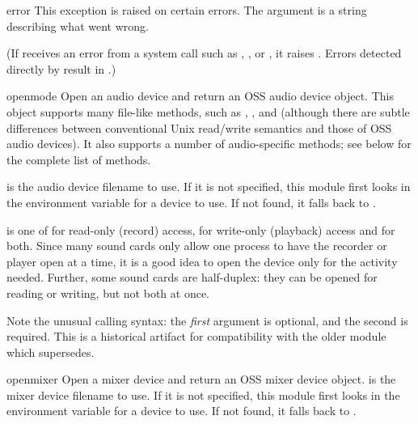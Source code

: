 \begin{excdesc}{error}
This exception is raised on certain errors.  The argument is a string
describing what went wrong.

(If  receives an error from a system call such as
, , or , it
raises .  Errors detected directly by
 result in .)
\end{excdesc}

\begin{funcdesc}{open}{mode}
Open an audio device and return an OSS audio device object.  This
object supports many file-like methods, such as ,
, and  (although there are subtle
differences between conventional Unix read/write semantics and those of
OSS audio devices).  It also supports a number of audio-specific
methods; see below for the complete list of methods.

 is the audio device filename to use.  If it is not
specified, this module first looks in the environment variable
 for a device to use.  If not found, it falls back to
.

 is one of  for read-only (record) access,
 for write-only (playback) access and  for both.
Since many sound cards only allow one process to have the recorder or
player open at a time, it is a good idea to open the device only for the
activity needed.  Further, some sound cards are half-duplex: they can be
opened for reading or writing, but not both at once.

Note the unusual calling syntax: the \emph{first} argument is optional,
and the second is required.  This is a historical artifact for
compatibility with the older  module which
 supersedes.  %
\end{funcdesc}

\begin{funcdesc}{openmixer}{}
Open a mixer device and return an OSS mixer device object.  
 is the mixer device filename to use.  If it is
not specified, this module first looks in the environment variable
 for a device to use.  If not found, it falls back to
.

\end{funcdesc}

